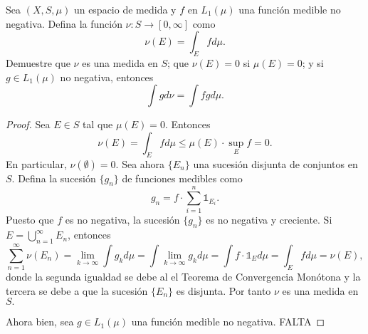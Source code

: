 \documentclass[12pt]{article}
\newenvironment{problem}[2][Problema]{\begin{trivlist}
\item[\hskip \labelsep {\bfseries #1}\hskip \labelsep {\bfseries #2.}]}{\end{trivlist}}
\begin{document}
\begin{problem}{18}
    Sea $(X, S, \mu)$ un espacio de medida y $f$ en $L_1(\mu)$ una función medible no negativa. Defina la función $\nu: S \rightarrow [0, \infty]$ como
    $$\nu(E) = \int_E f d\mu.$$
    Demuestre que $\nu$ es una medida en $S$; que $\nu(E) = 0$ si $\mu(E) = 0$; y si $g \in L_1(\mu)$ no negativa, entonces
    $$\int g d \nu = \int fg d \mu.$$
\end{problem}
 \begin{proof}
     Sea $E \in S$ tal que $\mu(E) = 0.$ Entonces
     $$\nu(E) = \int_E f d \mu \leq \mu(E) \cdot \sup_E f = 0.$$
     En particular, $\nu(\emptyset) = 0.$ Sea ahora $\{E_n\}$ una sucesión disjunta de conjuntos en $S$. Defina la sucesión $\{g_n\}$ de funciones medibles como 
     $$g_n = f \cdot \sum_{i=1}^n \mathbb{1}_{E_i}.$$ 
     Puesto que $f$ es no negativa, la sucesión $\{g_n\}$ es no negativa y creciente. Si $E = \bigcup_{n=1}^\infty E_n$, entonces 
 $$\sum_{n=1}^\infty \nu(E_n) = \lim_{k \to \infty} \int g_k d\mu = \int \lim_{k\to \infty} g_k d \mu = \int f \cdot \mathbb{1}_E d \mu = \int_E f d \mu = \nu(E),$$
donde la segunda igualdad se debe al el Teorema de Convergencia Monótona y la tercera se debe a que la sucesión $\{E_n\}$ es disjunta. Por tanto $\nu$ es una medida en $S.$

Ahora bien, sea $g \in L_1(\mu)$ una función medible no negativa. FALTA
 \end{proof}
\end{document}

